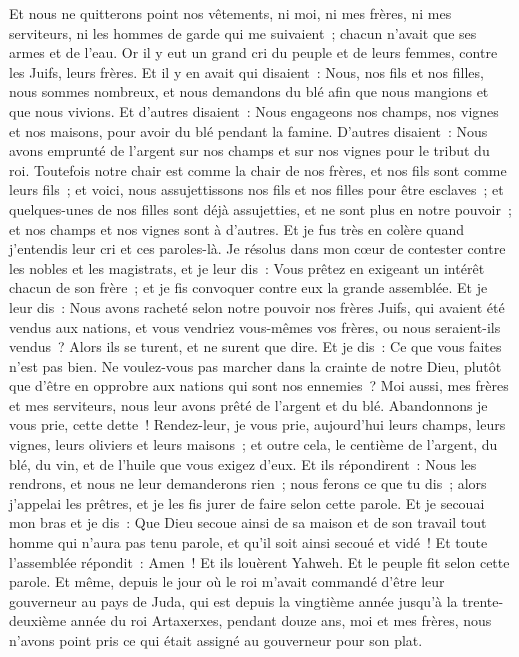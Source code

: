 \begin{multicols}{2}
Et nous ne quitterons point nos vêtements, ni moi, ni mes frères, ni mes serviteurs, ni les hommes de garde qui me suivaient~; chacun n'avait que ses armes et de l'eau.
\VerseOne{}Or il y eut un grand cri du peuple et de leurs femmes, contre les Juifs, leurs frères.
Et il y en avait qui disaient~: Nous, nos fils et nos filles, nous sommes nombreux, et nous demandons du blé afin que nous mangions et que nous vivions.
Et d'autres disaient~: Nous engageons nos champs, nos vignes et nos maisons, pour avoir du blé pendant la famine.
D'autres disaient~: Nous avons emprunté de l'argent sur nos champs et sur nos vignes pour le tribut du roi.
Toutefois notre chair est comme la chair de nos frères, et nos fils sont comme leurs fils~; et voici, nous assujettissons nos fils et nos filles pour être esclaves~; et quelques-unes de nos filles sont déjà assujetties, et ne sont plus en notre pouvoir~; et nos champs et nos vignes sont à d'autres.
Et je fus très en colère quand j'entendis leur cri et ces paroles-là.
Je résolus dans mon cœur de contester contre les nobles et les  magistrats, et je leur dis~: Vous prêtez en exigeant un intérêt chacun de son frère~; et je fis convoquer contre eux la grande assemblée.
Et je leur dis~: Nous avons racheté selon notre pouvoir nos frères Juifs, qui avaient été vendus aux nations, et vous vendriez vous-mêmes vos frères, ou nous seraient-ils vendus~? Alors ils se turent, et ne surent que dire. 
Et je dis~: Ce que vous faites n'est pas bien. Ne voulez-vous pas marcher dans la crainte de notre Dieu, plutôt que d'être en opprobre aux nations qui sont nos ennemies~?
Moi aussi, mes frères et mes serviteurs, nous leur avons prêté de l'argent et du blé. Abandonnons je vous prie, cette dette~!
Rendez-leur, je vous prie, aujourd'hui leurs champs, leurs vignes, leurs oliviers et leurs maisons~; et outre cela, le centième de l'argent, du blé, du vin, et de l'huile que vous exigez d'eux.
Et ils répondirent~: Nous les rendrons, et nous ne leur demanderons rien~; nous ferons ce que tu dis~; alors j'appelai les prêtres, et je les fis jurer de faire selon cette parole.
Et je secouai mon bras et je dis~: Que Dieu secoue ainsi de sa maison et de son travail tout homme qui n'aura pas tenu parole, et qu'il soit ainsi secoué et vidé~! Et toute l'assemblée répondit~: Amen~! Et ils louèrent Yahweh. Et le peuple fit selon cette parole.
Et même, depuis le jour où le roi m'avait commandé d'être leur gouverneur au pays de Juda, qui est depuis la vingtième année jusqu'à la trente-deuxième année du roi Artaxerxes, pendant douze ans, moi et mes frères, nous n'avons point pris ce qui était assigné au gouverneur pour son plat.

\end{multicols}
